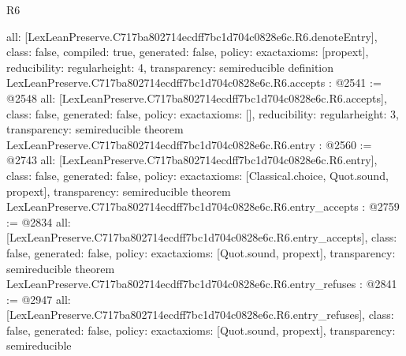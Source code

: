 \begin{lexlean}{R6}
\begin{coremodule}
{  all: [LexLeanPreserve.C717ba802714ecdff7bc1d704c0828e6c.R6.denoteEntry],
  class: false,
  compiled: true,
  generated: false,
  policy: exact{axioms: [propext]},
  reducibility: regular{height: 4},
  transparency: semireducible
}
definition LexLeanPreserve.C717ba802714ecdff7bc1d704c0828e6c.R6.accepts : @2541 := @2548 {
  all: [LexLeanPreserve.C717ba802714ecdff7bc1d704c0828e6c.R6.accepts],
  class: false,
  generated: false,
  policy: exact{axioms: []},
  reducibility: regular{height: 3},
  transparency: semireducible
}
theorem LexLeanPreserve.C717ba802714ecdff7bc1d704c0828e6c.R6.entry : @2560 := @2743 {
  all: [LexLeanPreserve.C717ba802714ecdff7bc1d704c0828e6c.R6.entry],
  class: false,
  generated: false,
  policy: exact{axioms: [Classical.choice, Quot.sound, propext]},
  transparency: semireducible
}
theorem LexLeanPreserve.C717ba802714ecdff7bc1d704c0828e6c.R6.entry_accepts : @2759 := @2834 {
  all: [LexLeanPreserve.C717ba802714ecdff7bc1d704c0828e6c.R6.entry_accepts],
  class: false,
  generated: false,
  policy: exact{axioms: [Quot.sound, propext]},
  transparency: semireducible
}
theorem LexLeanPreserve.C717ba802714ecdff7bc1d704c0828e6c.R6.entry_refuses : @2841 := @2947 {
  all: [LexLeanPreserve.C717ba802714ecdff7bc1d704c0828e6c.R6.entry_refuses],
  class: false,
  generated: false,
  policy: exact{axioms: [Quot.sound, propext]},
  transparency: semireducible
}


\end{coremodule}
\end{lexlean}
